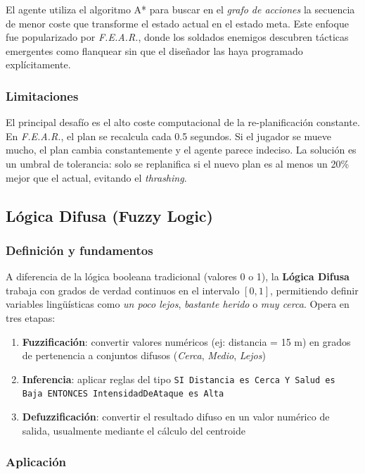 \documentclass[12pt,letterpaper]{article}
\begin{document}
El agente utiliza el algoritmo A* para buscar en el \textit{grafo de acciones} la secuencia de menor coste que transforme el estado actual en el estado meta. Este enfoque fue popularizado por \textit{F.E.A.R.}, donde los soldados enemigos descubren tácticas emergentes como flanquear sin que el diseñador las haya programado explícitamente.

\subsubsection{Limitaciones}

El principal desafío es el alto coste computacional de la re-planificación constante. En \textit{F.E.A.R.}, el plan se recalcula cada 0.5 segundos. Si el jugador se mueve mucho, el plan cambia constantemente y el agente parece indeciso. La solución es un umbral de tolerancia: solo se replanifica si el nuevo plan es al menos un 20\% mejor que el actual, evitando el \textit{thrashing}.

\subsection{Lógica Difusa (Fuzzy Logic)}

\subsubsection{Definición y fundamentos}

A diferencia de la lógica booleana tradicional (valores 0 o 1), la \textbf{Lógica Difusa} trabaja con grados de verdad continuos en el intervalo \([0, 1]\), permitiendo definir variables lingüísticas como \textit{un poco lejos}, \textit{bastante herido} o \textit{muy cerca}. Opera en tres etapas:

\begin{enumerate}[nosep]
  \item \textbf{Fuzzificación}: convertir valores numéricos (ej: distancia = 15 m) en grados de pertenencia a conjuntos difusos (\textit{Cerca}, \textit{Medio}, \textit{Lejos})
  \item \textbf{Inferencia}: aplicar reglas del tipo \texttt{SI Distancia es Cerca Y Salud es Baja ENTONCES IntensidadDeAtaque es Alta}
  \item \textbf{Defuzzificación}: convertir el resultado difuso en un valor numérico de salida, usualmente mediante el cálculo del centroide
\end{enumerate}

\subsubsection{Aplicación}
\end{document}
